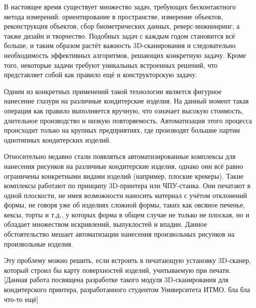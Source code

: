 \intro
В настоящее время существует множество задач, требующих бесконтактного метода измерений: ориентирование в пространстве, измерение объектов, реконструкция объектов, сбор биометрических данных, реверс-инжиниринг, а также дизайн и творчество. Подобных задач с каждым годом становится всё больше, и таким образом растёт важность 3D-сканирования и следовательно необходимость эффективных алгоритмов, решающих конкретную задачу. Кроме того, некоторые задачи требуют уникальных встроенных решений, что представляет собой как правило ещё и конструкторскую задачу.

Одним из конкретных применений такой технологии является фигурное нанесение глазури на различные кондитерские изделия. На данный момент такая операция как правило выполняется вручную, что означает высокую стоимость, длительное производство и низкую повторяемость. Автоматизация этого процесса происходит только на крупных предприятиях, где производят большие партии однотипных кондитерских изделий.

Относительно недавно стали появляться автоматизированные комплексы для нанесения рисунков на различные кондитерские изделия, однако они всё равно ограничены конкретными видами изделий (например, плоские крекеры). Такие комплексы работают по принципу 3D-принтера или ЧПУ-станка. Они печатают в одной плоскости, не имея возможности наносить материал с учётом отклонений формы, не говоря уже об изделиях сложной формы, таких как овсяное печенье, кексы, торты и т.д., у которых форма в общем случае не только не плоская, но и обладает множеством искривлений, выпуклостей и впадин. Данное обстоятельство мешает автоматизации нанесения произвольных рисунков на произвольные изделия.

Эту проблему можно решить, если встроить в печатающую установку 3D-сканер, который строил бы карту поверхностей изделий, учитываемую при печати. [Данная работа посвящена разработке такого модуля 3D-сканирования для кондитерского принтера, разработанного студентом Университета ИТМО. бла бла что-то ещё]